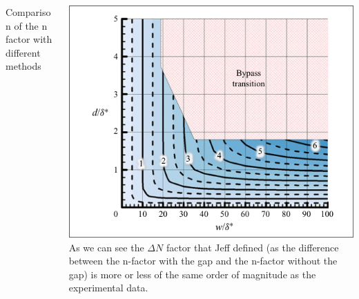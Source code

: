 \documentclass[
  aspectratio=169, %
  t, %
  onlytextwidth, %
  10pt, %
]{beamer}
\begin{document}
\begin{frame}
\begin{columns}[T]
\begin{column}{0.55\linewidth}
			Comparison of the n factor with different methods
		\end{column}
		\begin{column}{0.44\linewidth} %
			\includegraphics[width=\linewidth]{Images/curveJeff.png}
			As we can see the $\Delta N$ factor that Jeff defined (as the difference between the n-factor with the gap and the n-factor without the gap) is more or less of the same order of magnitude as the experimental data.
		\end{column}
	\end{columns}

\end{frame}
\end{document}
